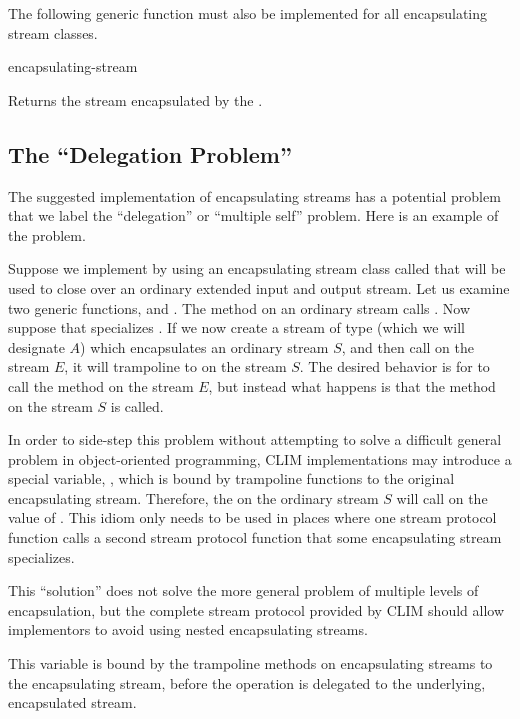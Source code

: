 The following generic function must also be implemented for all encapsulating
stream classes.

 {encapsulating-stream}

Returns the stream encapsulated by the 
.


\subsection {The ``Delegation Problem''}

The suggested implementation of encapsulating streams has a potential problem
that we label the ``delegation'' or ``multiple self'' problem.  Here is an
example of the problem.

Suppose we implement  by using an encapsulating stream
class called  that will be used to close over an
ordinary extended input and output stream.  Let us examine two generic
functions,  and .  The
 method on an ordinary stream calls .
Now suppose that  specializes
.  If we now create a stream of type
 (which we will designate $A$) which encapsulates an
ordinary stream $S$, and then call  on the stream $E$, it will
trampoline to  on the stream $S$.  The desired behavior is
for  to call the  method on the stream
$E$, but instead what happens is that the  method on the
stream $S$ is called.

In order to side-step this problem without attempting to solve a difficult
general problem in object-oriented programming, CLIM implementations may
introduce a special variable, , which is bound by
trampoline functions to the original encapsulating stream.  Therefore, the
 on the ordinary stream $S$ will call 
on the value of .  This idiom only needs
to be used in places where one stream protocol function calls a second stream
protocol function that some encapsulating stream specializes.

This ``solution'' does not solve the more general problem of multiple levels of
encapsulation, but the complete stream protocol provided by CLIM should allow
implementors to avoid using nested encapsulating streams.


This variable is bound by the trampoline methods on encapsulating streams to the
encapsulating stream, before the operation is delegated to the underlying,
encapsulated stream.
